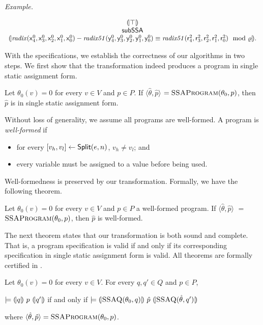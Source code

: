 \noindent
\emph{Example.}

\[
\begin{array}{c}
{(\!|}{\top}{|\!)}\\
\mbox{\textsf{subSSA}}\\
{(\!|}{\mathit{radix}(\mbox{\textsf{x}}^0_4, \mbox{\textsf{x}}^0_3, \mbox{\textsf{x}}^0_2,
\mbox{\textsf{x}}^0_1, \mbox{\textsf{x}}^0_0) -
\mathit{radix51}(\mbox{\textsf{y}}^0_4, \mbox{\textsf{y}}^0_3, \mbox{\textsf{y}}^0_2,
\mbox{\textsf{y}}^0_1, \mbox{\textsf{y}}^0_0)
\equiv
\mathit{radix51}(\mbox{\textsf{r}}^2_4, \mbox{\textsf{r}}^2_3, \mbox{\textsf{r}}^2_2,
\mbox{\textsf{r}}^2_1, \mbox{\textsf{r}}^2_0)
\mod {\varrho}
}{|\!)}.
\end{array}
\]



With the \coq specifications, we establish the correctness of our
algorithms in two steps. We first show that the transformation indeed
produces a program in single static assignment form.
\begin{theorem}
  Let $\theta_0(v) = 0$ for every $v \in V$ and $p \in P$.
  If $\langle \hat{\theta}, \hat{p} \rangle$ $=
  \textsc{SSAProgram}(\theta_0, p)$, then 
  $\hat{p}$ is in single static assignment form.
\end{theorem}

Without loss of generality, we assume all programs are well-formed. 
A program is \emph{well-formed} if
\begin{itemize}
\item for every ${[}{v_h}, {v_l}{]} \leftarrow \mbox{\textsf{Split}}(e, n)$, $v_h
  \neq v_l$; and
\item every variable must be assigned to a value before being used.
\end{itemize}
Well-formedness is preserved by our transformation. Formally, we have
the following theorem.
\begin{theorem}
  Let $\theta_0(v) = 0$ for every $v \in V$ and $p \in P$ a
  well-formed program. If $\langle \hat{\theta}, \hat{p} \rangle$ $=$ 
  $\textsc{SSAProgram}(\theta_0, p)$, then $\hat{p}$ is well-formed.
\end{theorem}

The next theorem states that our transformation is both sound and
complete. That is, a program specification is valid if and only if its
corresponding specification in single static assignment form is valid.
All theorems are formally certified in \coq. 
\begin{theorem}
  Let $\theta_0(v) = 0$ for every $v \in V$. For every $q, q' \in Q$
  and $p \in P$,
  \begin{center}
    $\models {(\!|}{q}{|\!)}~{p}~{(\!|}{q'}{|\!)}$ if and only if
    $\models {(\!|}{\textsc{SSAQ}(\theta_0, q)}{|\!)}~{\hat{p}}~{(\!|}{\textsc{SSAQ}(\hat{\theta}, q')}{|\!)}$
  \end{center}
  where $\langle \hat{\theta}, \hat{p} \rangle =
  \textsc{SSAProgram}(\theta_0, p)$.
  \label{theorem:ssa}
\end{theorem}

